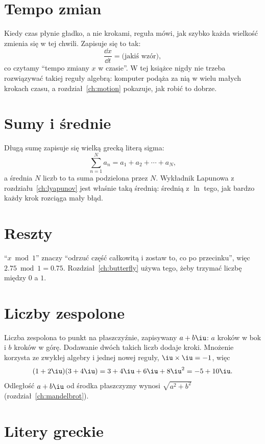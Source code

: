 \section{Tempo zmian}
\label{sec:appc-rates}

\noindent
Kiedy czas płynie gładko, a nie krokami, reguła mówi, jak szybko każda
wielkość zmienia się w tej chwili. Zapisuje się to tak:
\[ \frac{\dd x}{\dd t} = \text{(jakiś wzór)}, \]
co czytamy \enquote{tempo zmiany $x$ w czasie}. W tej książce nigdy nie
trzeba rozwiązywać takiej reguły algebrą: komputer podąża za nią w wielu
małych krokach czasu, a rozdział~\ref{ch:motion} pokazuje, jak robić to
dobrze.

\section{Sumy i średnie}
\label{sec:appc-sums}

\noindent
Długą sumę zapisuje się wielką grecką literą sigma:
\[ \sum_{n=1}^{N} a_{n} = a_{1} + a_{2} + \cdots + a_{N} , \]
a średnia $N$ liczb to ta suma podzielona przez $N$. Wykładnik Lapunowa z
rozdziału~\ref{ch:lyapunov} jest właśnie taką średnią: średnią z $\ln$ tego,
jak bardzo każdy krok rozciąga mały błąd.

\section{Reszty}
\label{sec:appc-mod}

\noindent
\enquote{$x \bmod 1$} znaczy \enquote{odrzuć część całkowitą i zostaw to, co
po przecinku}, więc $\num{2.75} \bmod 1 = \num{0.75}$.
Rozdział~\ref{ch:butterfly} używa tego, żeby trzymać liczbę między $0$ a $1$.

\section{Liczby zespolone}
\label{sec:appc-complex}

\noindent
Liczba zespolona to punkt na płaszczyźnie, zapisywany $a + b\iu$: $a$ kroków
w bok i $b$ kroków w górę. Dodawanie dwóch takich liczb dodaje kroki.
Mnożenie korzysta ze zwykłej algebry i jednej nowej reguły,
$\iu \times \iu = -1$, więc
\[ (1 + 2\iu)(3 + 4\iu) = 3 + 4\iu + 6\iu + 8\iu^{2} = -5 + 10\iu . \]
Odległość $a + b\iu$ od środka płaszczyzny wynosi $\sqrt{a^{2} + b^{2}}$
(rozdział~\ref{ch:mandelbrot}).

\section{Litery greckie}
\label{sec:appc-greek}

